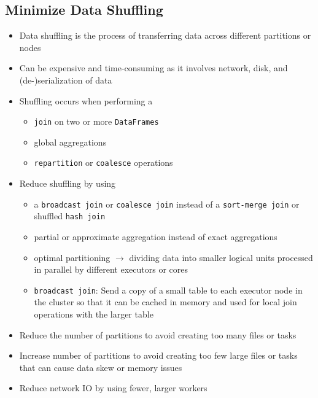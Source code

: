 \documentclass[11pt]{scrartcl}
\begin{document}
\subsection{Minimize Data Shuffling}
\begin{itemize}
	\item Data shuffling is the process of transferring data across different partitions or nodes
	\item Can be expensive and time-consuming as it involves network, disk, and (de-)serialization of data
	\item Shuffling occurs when performing a
	\begin{itemize}
		\item \texttt{join} on two or more \texttt{DataFrames}
		\item global aggregations 
		\item \texttt{repartition} or \texttt{coalesce} operations
	\end{itemize}
	\item Reduce shuffling by using
	\begin{itemize}
		\item a \texttt{broadcast join} or \texttt{coalesce join} instead of a \texttt{sort-merge join} or shuffled \texttt{hash join}
		\item partial or approximate aggregation instead of exact aggregations
		\item optimal partitioning $\to$ dividing data into smaller logical units processed in parallel by different executors or cores 
		\item \texttt{broadcast join}: Send a copy of a small table to each executor node in the cluster so that it can be cached in memory and used for local join operations with the larger table
	\end{itemize}
	\item Reduce the number of partitions to avoid creating too many files or tasks
	\item Increase number of partitions to avoid creating too few large files or tasks that can cause data skew or memory issues
	\item Reduce network IO by using fewer, larger workers
\end{itemize}
\end{document}
